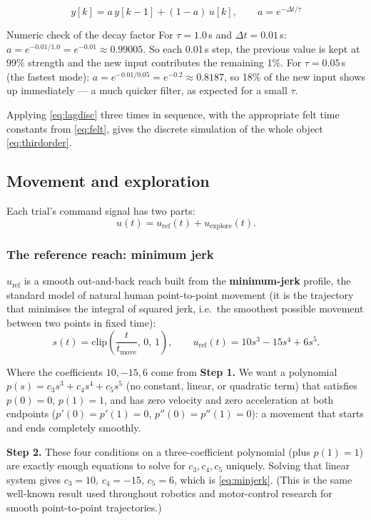 \documentclass[11pt,a4paper]{article}
\newcommand{\dt}{\Delta t}
\begin{document}
\begin{equation}
y[k] = a\, y[k-1] + (1-a)\, u[k],
\qquad a = e^{-\dt/\tau}
\label{eq:lagdisc}
\end{equation}

\begin{examplebox}{Numeric check of the decay factor}
For $\tau=1.0$\,s and $\dt=0.01$\,s: $a=e^{-0.01/1.0}=e^{-0.01}\approx0.99005$.
So each 0.01\,s step, the previous value is kept at 99\% strength and the new
input contributes the remaining 1\%. For $\tau=0.05$\,s (the fastest mode):
$a=e^{-0.01/0.05}=e^{-0.2}\approx0.8187$, so 18\% of the new input shows up
immediately --- a much quicker filter, as expected for a small $\tau$.
\end{examplebox}

Applying \eqref{eq:lagdisc} three times in sequence, with the appropriate
felt time constants from \eqref{eq:felt}, gives the discrete simulation of the
whole object \eqref{eq:thirdorder}.

\subsection{Movement and exploration}

Each trial's command signal has two parts:
\begin{equation}
u(t) = u_{\mathrm{ref}}(t) + u_{\mathrm{explore}}(t).
\label{eq:command}
\end{equation}

\subsubsection{The reference reach: minimum jerk}

$u_{\mathrm{ref}}$ is a smooth out-and-back reach built from the
\textbf{minimum-jerk} profile, the standard model of natural human point-to-point
movement (it is the trajectory that minimises the integral of squared jerk,
i.e.\ the smoothest possible movement between two points in fixed time):
\begin{equation}
s(t) = \mathrm{clip}\!\left(\frac{t}{t_{\mathrm{move}}},\,0,\,1\right), \qquad
u_{\mathrm{ref}}(t) = 10s^3 - 15s^4 + 6s^5.
\label{eq:minjerk}
\end{equation}

\begin{stepbox}{Where the coefficients $10,-15,6$ come from}
\textbf{Step 1.} We want a polynomial $p(s)=c_3s^3+c_4s^4+c_5s^5$ (no constant,
linear, or quadratic term) that satisfies $p(0)=0$, $p(1)=1$, and has zero
velocity and zero acceleration at both endpoints ($p'(0)=p'(1)=0$,
$p''(0)=p''(1)=0$): a movement that starts and ends completely smoothly.

\textbf{Step 2.} These four conditions on a three-coefficient polynomial (plus
$p(1)=1$) are exactly enough equations to solve for $c_3,c_4,c_5$ uniquely.
Solving that linear system gives $c_3=10$, $c_4=-15$, $c_5=6$, which is
\eqref{eq:minjerk}. (This is the same well-known result used throughout
robotics and motor-control research for smooth point-to-point trajectories.)
\end{stepbox}
\end{document}
